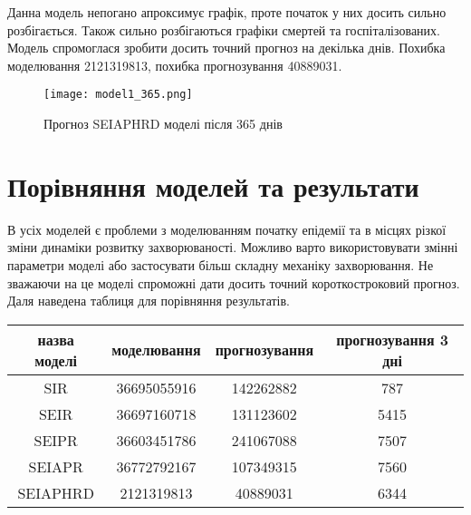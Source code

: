 Данна модель непогано апроксимує графік, проте початок у них досить сильно 
розбігається. Також сильно розбігаються графіки смертей та госпіталізованих.
Модель спромоглася зробити досить точний прогноз на декілька 
днів.
Похибка моделювання 2121319813, похибка прогнозування 40889031.
\begin{figure}[H]
    \centering
    \texttt{[image: model1\_365.png]}
    \caption{Прогноз SEIAPHRD моделі після 365 днів}
    \label{fig:plot5}
\end{figure}


\section{Порівняння моделей та результати}


В усіх моделей є проблеми з моделюванням початку епідемії та в місцях 
різкої зміни динаміки розвитку захворюваності. Можливо варто 
використовувати змінні параметри моделі або застосувати більш складну 
механіку захворювання. 
Не зважаючи на це моделі спроможні дати досить точний 
короткостроковий прогноз. 
Даля наведена таблиця для порівняння результатів. 

\begin{center}
    \begin{tabular}{||c c c c||} 
        \hline
        назва моделі & моделювання & 
        прогнозування & прогнозування 3 дні \\ [0.1ex] 
        \hline\hline
        SIR & 36695055916 & 142262882 & 787 \\ 
        \hline
        SEIR &  36697160718 & 131123602 & 5415 \\
        \hline
        SEIPR &  36603451786 & 241067088 & 7507 \\
        \hline
        SEIAPR &  36772792167 & 107349315 & 7560 \\
        \hline
        SEIAPHRD & 2121319813 & 40889031 & 6344 \\ [1ex] 
        \hline
    \end{tabular}
\end{center}
